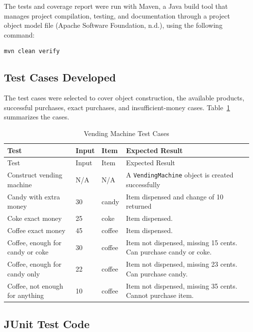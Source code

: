 \documentclass[12pt]{article}
\begin{document}
The tests and coverage report were run with Maven, a Java build tool that manages project compilation, testing, and documentation through a project object model file (Apache Software Foundation, n.d.), using the following command:

\begin{lstlisting}[language=bash,caption={JUnit and JaCoCo Test Command}]
mvn clean verify
\end{lstlisting}

\subsection{Test Cases Developed}

The test cases were selected to cover object construction, the available products, successful purchases, exact purchases, and insufficient-money cases. Table~\ref{tab:testcases} summarizes the cases.

\begin{longtable}{>{\raggedright\arraybackslash}p{1.6in}p{0.65in}p{0.75in}>{\raggedright\arraybackslash}p{2.8in}}
\caption{Vending Machine Test Cases}
\label{tab:testcases}\\
\toprule
Test & Input & Item & Expected Result \\
\midrule
\endfirsthead
\toprule
Test & Input & Item & Expected Result \\
\midrule
\endhead
Construct vending machine & N/A & N/A & A \texttt{VendingMachine} object is created successfully \\
Candy with extra money & 30 & candy & Item dispensed and change of 10 returned \\
Coke exact money & 25 & coke & Item dispensed. \\
Coffee exact money & 45 & coffee & Item dispensed. \\
Coffee, enough for candy or coke & 30 & coffee & Item not dispensed, missing 15 cents. Can purchase candy or coke. \\
Coffee, enough for candy only & 22 & coffee & Item not dispensed, missing 23 cents. Can purchase candy. \\
Coffee, not enough for anything & 10 & coffee & Item not dispensed, missing 35 cents. Cannot purchase item. \\
\bottomrule
\end{longtable}

\subsection{JUnit Test Code}
\end{document}
